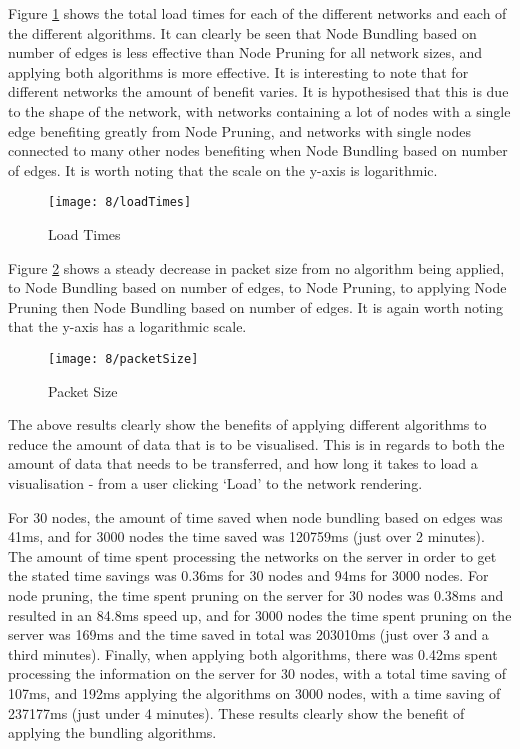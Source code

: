 \documentclass[../dissertation.tex]{subfiles}
\begin{document}
Figure \ref{fig:loadTimes} shows the total load times for each of the different networks and each of the different algorithms. It can clearly be seen that Node Bundling based on number of edges is less effective than Node Pruning for all network sizes, and applying both algorithms is more effective. It is interesting to note that for different networks the amount of benefit varies. It is hypothesised that this is due to the shape of the network, with networks containing a lot of nodes with a single edge benefiting greatly from Node Pruning, and networks with single nodes connected to many other nodes benefiting when Node Bundling based on number of edges. It is worth noting that the scale on the y-axis is logarithmic.

\begin{figure}[H]
    \centering
    \texttt{[image: 8/loadTimes]}
    \caption{Load Times}
    \label{fig:loadTimes}
\end{figure}

Figure \ref{fig:packetSize} shows a steady decrease in packet size from no algorithm being applied, to Node Bundling based on number of edges, to Node Pruning, to applying Node Pruning then Node Bundling based on number of edges. It is again worth noting that the y-axis has a logarithmic scale.

\begin{figure}[H]
    \centering
    \texttt{[image: 8/packetSize]}
    \caption{Packet Size}
    \label{fig:packetSize}
\end{figure}

The above results clearly show the benefits of applying different algorithms to reduce the amount of data that is to be visualised. This is in regards to both the amount of data that needs to be transferred, and how long it takes to load a visualisation - from a user clicking `Load' to the network rendering. 

For 30 nodes, the amount of time saved when node bundling based on edges was 41ms, and for 3000 nodes the time saved was 120759ms (just over 2 minutes). The amount of time spent processing the networks on the server in order to get the stated time savings was 0.36ms for 30 nodes and 94ms for 3000 nodes. For node pruning, the time spent pruning on the server for 30 nodes was 0.38ms and resulted in an 84.8ms speed up, and for 3000 nodes the time spent pruning on the server was 169ms and the time saved in total was 203010ms (just over 3 and a third minutes). Finally, when applying both algorithms, there was 0.42ms spent processing the information on the server for 30 nodes, with a total time saving of 107ms, and 192ms applying the algorithms on 3000 nodes, with a time saving of 237177ms (just under 4 minutes). These results clearly show the benefit of applying the bundling algorithms.
\end{document}

